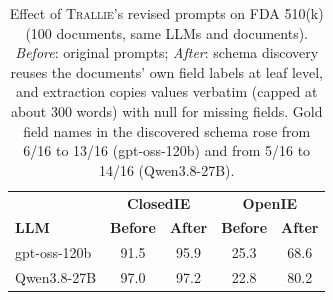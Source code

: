 \begin{table}[t]
  \centering
  \small
  \setlength{\tabcolsep}{4pt}
  \begin{tabular}{l c c c c}
    \hline
     & \multicolumn{2}{c}{\textbf{ClosedIE}} & \multicolumn{2}{c}{\textbf{OpenIE}} \\
    \textbf{LLM} & \textbf{Before} & \textbf{After} & \textbf{Before} & \textbf{After} \\
    \hline
    gpt-oss-120b & 91.5 & 95.9 & 25.3 & 68.6 \\
    Qwen3.8-27B  & 97.0 & 97.2 & 22.8 & 80.2 \\
    \hline
  \end{tabular}
  \caption{Effect of \textsc{Trallie}'s revised prompts on FDA 510(k) (100 documents, same LLMs and documents).
    \emph{Before}: original prompts; \emph{After}: schema discovery reuses the documents' own field labels at leaf level, and extraction copies values verbatim (capped at about 300 words) with null for missing fields.
    Gold field names in the discovered schema rose from 6/16 to 13/16 (gpt-oss-120b) and from 5/16 to 14/16 (Qwen3.8-27B).}
  \label{tab:prompt-ablation}
\end{table}

